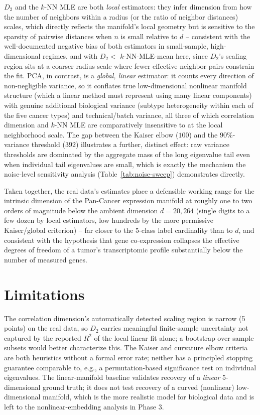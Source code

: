 \documentclass[11pt]{article}
\begin{document}
$D_2$ and the $k$-NN MLE are both \emph{local} estimators: they infer
dimension from how the number of neighbors within a radius (or the ratio
of neighbor distances) scales, which directly reflects the manifold's
local geometry but is sensitive to the sparsity of pairwise distances when
$n$ is small relative to $d$ -- consistent with the well-documented
negative bias of both estimators in small-sample, high-dimensional
regimes, and with $D_2 < $ $k$-NN-MLE-mean here, since $D_2$'s scaling
region sits at a coarser radius scale where fewer effective neighbor pairs
constrain the fit. PCA, in contrast, is a \emph{global, linear} estimator:
it counts every direction of non-negligible variance, so it conflates true
low-dimensional nonlinear manifold structure (which a linear method must
represent using many linear components) with genuine additional
biological variance (subtype heterogeneity within each of the five cancer
types) and technical/batch variance, all three of which correlation
dimension and $k$-NN MLE are comparatively insensitive to at the local
neighborhood scale. The gap between the Kaiser elbow ($100$) and the
$90\%$-variance threshold ($392$) illustrates a further, distinct effect:
raw variance thresholds are dominated by the aggregate mass of the long
eigenvalue tail even when individual tail eigenvalues are small, which is
exactly the mechanism the noise-level sensitivity analysis
(Table~\ref{tab:noise-sweep}) demonstrates directly.

Taken together, the real data's estimates place a defensible working range
for the intrinsic dimension of the Pan-Cancer expression manifold at
roughly one to two orders of magnitude below the ambient dimension
$d = 20{,}264$ (single digits to a few dozen by local estimators, low
hundreds by the more permissive Kaiser/global criterion) -- far closer to
the $5$-class label cardinality than to $d$, and consistent with the
hypothesis that gene co-expression collapses the effective degrees of
freedom of a tumor's transcriptomic profile substantially below the number
of measured genes.

\section{Limitations}

The correlation dimension's automatically detected scaling region is
narrow (5 points) on the real data, so $D_2$ carries meaningful
finite-sample uncertainty not captured by the reported $R^2$ of the local
linear fit alone; a bootstrap over sample subsets would better
characterize this. The Kaiser and curvature elbow criteria are both
heuristics without a formal error rate; neither has a principled stopping
guarantee comparable to, e.g., a permutation-based significance test on
individual eigenvalues. The linear-manifold baseline validates recovery of
a \emph{linear} 5-dimensional ground truth; it does not test recovery of a
curved (nonlinear) low-dimensional manifold, which is the more realistic
model for biological data and is left to the nonlinear-embedding analysis
in Phase 3.
\end{document}
